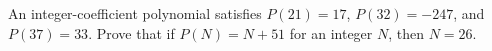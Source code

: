 An integer-coefficient polynomial satisfies $P(21)=17$, $P(32)=-247$, and $P(37)=33$. Prove that if $P(N)=N+51$ for an integer $N$, then $N=26$.
